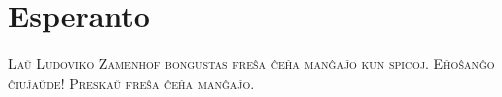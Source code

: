 

\presection\section*{\checkno Esperanto}\postsection

\textsc{Laŭ Ludoviko Zamenhof bongustas freŝa ĉeĥa manĝaĵo kun spicoj.
Eĥoŝanĝo ĉiuĵaŭde! Preskaŭ freŝa ĉeĥa manĝaĵo.}